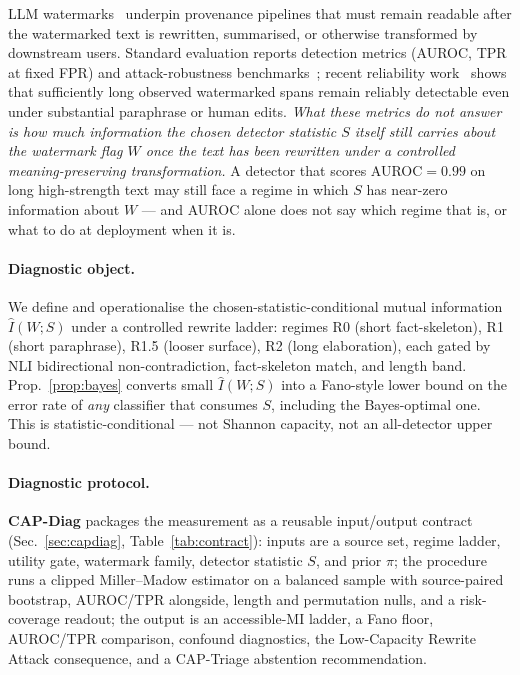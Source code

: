 \documentclass[11pt]{article}
\begin{document}
LLM watermarks~\citep{kirchenbauer2023watermark,zhao2024provable,kuditipudi2024robust}
underpin provenance pipelines that must remain readable after the watermarked
text is rewritten, summarised, or otherwise transformed by downstream users.
Standard evaluation reports detection metrics (AUROC, TPR at fixed FPR) and
attack-robustness benchmarks~\citep{piet2024markmywords,tu2024waterbench,liang2024waterpark};
recent reliability work~\citep{kirchenbauer2024reliability} shows that
sufficiently long observed watermarked spans remain reliably detectable
even under substantial paraphrase or human edits. \emph{What these metrics
do not answer is how much information the chosen detector statistic $S$
itself still carries about the watermark flag $W$ once the text has been
rewritten under a controlled meaning-preserving transformation.} A detector
that scores AUROC$=0.99$ on long high-strength text may still face a regime
in which $S$ has near-zero information about $W$ --- and AUROC alone does
not say which regime that is, or what to do at deployment when it is.

\paragraph{Diagnostic object.}
We define and operationalise the chosen-statistic-conditional mutual
information $\hat I(W;S)$ under a controlled rewrite ladder: regimes R0
(short fact-skeleton), R1 (short paraphrase), R1.5 (looser surface), R2
(long elaboration), each gated by NLI bidirectional non-contradiction,
fact-skeleton match, and length band. Prop.~\ref{prop:bayes} converts
small $\hat I(W;S)$ into a Fano-style lower bound on the error rate of
\emph{any} classifier that consumes $S$, including the Bayes-optimal one.
This is statistic-conditional --- not Shannon capacity, not an
all-detector upper bound.

\paragraph{Diagnostic protocol.}
\textbf{CAP-Diag} packages the measurement as a reusable
input/output contract (Sec.~\ref{sec:capdiag}, Table~\ref{tab:contract}):
inputs are a source set, regime ladder, utility gate, watermark family,
detector statistic $S$, and prior $\pi$; the procedure runs a clipped
Miller--Madow estimator on a balanced sample with source-paired bootstrap,
AUROC/TPR alongside, length and permutation nulls, and a risk-coverage
readout; the output is an accessible-MI ladder, a Fano floor, AUROC/TPR
comparison, confound diagnostics, the Low-Capacity Rewrite Attack
consequence, and a CAP-Triage abstention recommendation.
\end{document}
